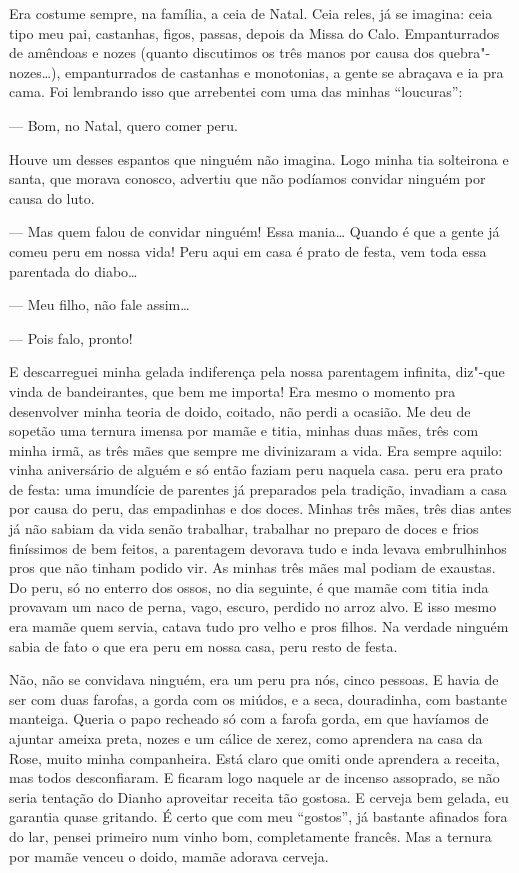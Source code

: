 Era costume sempre, na família, a ceia de Natal. Ceia reles, já se
imagina: ceia tipo meu pai, castanhas, figos, passas, depois da Missa do
Calo. Empanturrados de amêndoas e nozes (quanto discutimos os três manos
por causa dos quebra"-nozes\ldots{}), empanturrados de castanhas e monotonias,
a gente se abraçava e ia pra cama. Foi lembrando isso que arrebentei com
uma das minhas ``loucuras'':

--- Bom, no Natal, quero comer peru.

Houve um desses espantos que ninguém não imagina. Logo minha tia
solteirona e santa, que morava conosco, advertiu que não podíamos
convidar ninguém por causa do luto.

--- Mas quem falou de convidar ninguém! Essa mania\ldots{} Quando é que a
gente já comeu peru em nossa vida! Peru aqui em casa é prato de festa,
vem toda essa parentada do diabo\ldots{}

--- Meu filho, não fale assim\ldots{}

--- Pois falo, pronto!

E descarreguei minha gelada indiferença pela nossa parentagem infinita,
diz"-que vinda de bandeirantes, que bem me importa! Era mesmo o momento
pra desenvolver minha teoria de doido, coitado, não perdi a ocasião. Me
deu de sopetão uma ternura imensa por mamãe e titia, minhas duas mães,
três com minha irmã, as três mães que sempre me divinizaram a vida. Era
sempre aquilo: vinha aniversário de alguém e só então faziam peru
naquela casa. peru era prato de festa: uma imundície de parentes já
preparados pela tradição, invadiam a casa por causa do peru, das
empadinhas e dos doces. Minhas três mães, três dias antes já não sabiam
da vida senão trabalhar, trabalhar no preparo de doces e frios
finíssimos de bem feitos, a parentagem devorava tudo e inda levava
embrulhinhos pros que não tinham podido vir. As minhas três mães mal
podiam de exaustas. Do peru, só no enterro dos ossos, no dia seguinte, é
que mamãe com titia inda provavam um naco de perna, vago, escuro,
perdido no arroz alvo. E isso mesmo era mamãe quem servia, catava tudo
pro velho e pros filhos. Na verdade ninguém sabia de fato o que era peru
em nossa casa, peru resto de festa.

Não, não se convidava ninguém, era um peru pra nós, cinco pessoas. E
havia de ser com duas farofas, a gorda com os miúdos, e a seca,
douradinha, com bastante manteiga. Queria o papo recheado só com a
farofa gorda, em que havíamos de ajuntar ameixa preta, nozes e um cálice
de xerez, como aprendera na casa da Rose, muito minha companheira. Está
claro que omiti onde aprendera a receita, mas todos desconfiaram. E
ficaram logo naquele ar de incenso assoprado, se não seria tentação do
Dianho aproveitar receita tão gostosa. E cerveja bem gelada, eu garantia
quase gritando. É certo que com meu ``gostos'', já bastante afinados
fora do lar, pensei primeiro num vinho bom, completamente francês. Mas a
ternura por mamãe venceu o doido, mamãe adorava cerveja.

